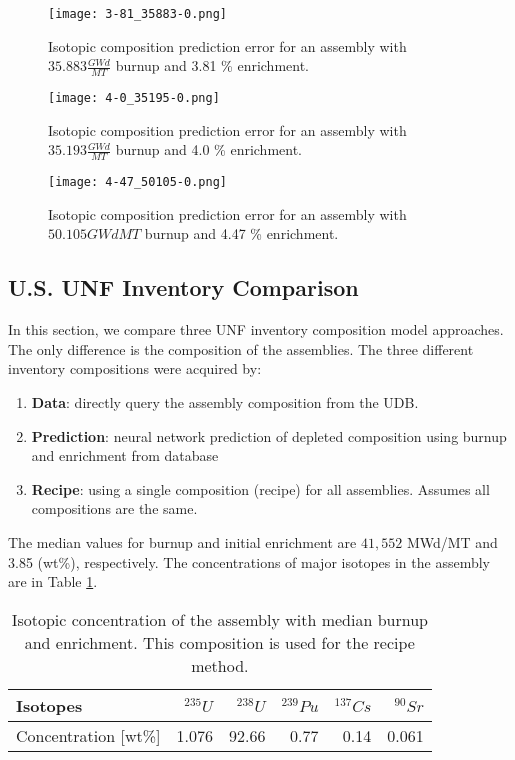 \begin{figure}
    \centering
    \texttt{[image: 3-81\_35883-0.png]}
    \caption{Isotopic composition prediction error for an assembly with 
             $35.883 \frac{GWd}{MT}$ burnup and 3.81  \% enrichment.}
    \label{fig:3-81_35883-0}
\end{figure}

\begin{figure}
    \centering
    \texttt{[image: 4-0\_35195-0.png]}
    \caption{Isotopic composition prediction error for an assembly with 
             $35.193 \frac{GWd}{MT}$ burnup and 4.0 \% enrichment.}
    \label{fig:4-0_35195-0}
\end{figure}


\begin{figure}
    \centering
    \texttt{[image: 4-47\_50105-0.png]}
    \caption{Isotopic composition prediction error for an assembly with 
             $50.105 {GWd}{MT}$ burnup and 4.47  \% enrichment.}
    \label{fig:4-47_50105-0}
\end{figure}

\FloatBarrier

\subsection{U.S. \gls{UNF} Inventory Comparison}

In this section, we compare three \gls{UNF} inventory composition
model approaches.
The only difference is the composition of the
assemblies. The three different inventory compositions were acquired by:

\begin{enumerate}
    \item \textbf{Data}: directly query the assembly composition from the \gls{UDB}.
    \item \textbf{Prediction}: neural network prediction of depleted composition using burnup and enrichment from database
    \item \textbf{Recipe}: using a single composition (recipe) for all assemblies. Assumes all compositions are the same.
\end{enumerate}

The median values for burnup and initial enrichment are
$41,552$ MWd/MT and 3.85 (wt\%), respectively. The concentrations of major
isotopes in the assembly are in Table \ref{tab:avg_assem}.


\begin{table}[h]
    \centering
    \begin{tabular}{|l|r|r|r|r|r|}
        \hline
        Isotopes & $^{235}U$ & $^{238}U$ & $^{239}Pu$ & $^{137}Cs$ & $^{90}Sr$ \\
        \hline
        Concentration [wt\%] & 1.076 & 92.66 & 0.77 & 0.14 & 0.061 \\
        \hline
    \end{tabular}
    \caption{Isotopic concentration of the assembly with median burnup and
             enrichment. This composition is used for the recipe method. 
    \label{tab:avg_assem}}
\end{table}



